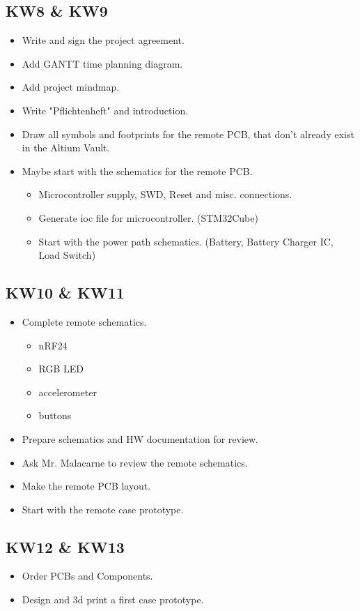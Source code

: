 \subsection{KW8 \& KW9}
\label{ssec:KW8_KW9}
\begin{itemize}
    \item Write and sign the project agreement.
    \item Add GANTT time planning diagram.
    \item Add project mindmap.
    \item Write "Pflichtenheft" and introduction.
    \item Draw all symbols and footprints for the remote PCB, that don't already exist in the Altium Vault.
    \item Maybe start with the schematics for the remote PCB.
    \begin{itemize}
        \item Microcontroller supply, SWD, Reset and misc. connections.
        \item Generate ioc file for microcontroller. (STM32Cube)
        \item Start with the power path schematics. (Battery, Battery Charger IC, Load Switch)
    \end{itemize}
\end{itemize}


\subsection{KW10 \& KW11}
\label{ssec:KW10_KW11}
\begin{itemize}
    \item Complete remote schematics.
    \begin{itemize}
        \item nRF24
        \item RGB LED
        \item accelerometer
        \item buttons
    \end{itemize}
    \item Prepare schematics and HW documentation for review.
    \item Ask Mr. Malacarne to review the remote schematics.
    \item Make the remote PCB layout.
    \item Start with the remote case prototype.
\end{itemize}


\subsection{KW12 \& KW13}
\label{ssec:KW12_KW13}
\begin{itemize}
    \item Order PCBs and Components.
    \item Design and 3d print a first case prototype.
\end{itemize}


